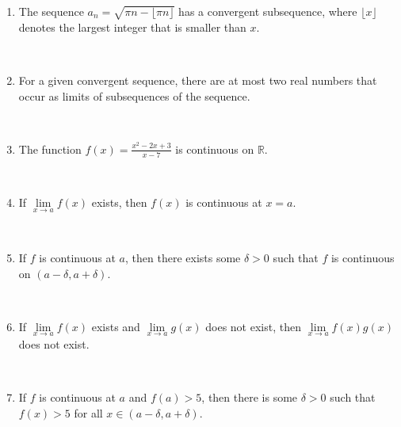 \documentclass[12pt]{amsart}
\def\d{\delta}
\newcommand{\R}{{\mathbb{R}}}
\numberwithin{equation}{section}
\theoremstyle{plain} %
\theoremstyle{definition}
\theoremstyle{remark}
\begin{document}
\begin{enumerate}
 \
 

	
	
	 
 
 \item  The sequence $a_n =\sqrt{\pi n - \lfloor \pi n\rfloor}$ has a convergent subsequence, where $\lfloor x \rfloor$ denotes the largest integer that is smaller than $x$.
 
 \
 

 
 \item  For a given convergent sequence,  there are at most two real numbers that occur as limits of subsequences of the sequence.
 
 \

 
	 
	 \item  The function $\displaystyle f(x) = \frac{x^2 - 2x + 3}{x-7}$ is continuous on $\R$.
	 
	 \
	 

	 
	 \item  If $\lim\limits_{x\to a} f(x)$ exists, then $f(x)$ is continuous at $x=a$.
	 
	 \
	 

	 
	 \item  If $f$ is continuous at $a$, then there exists some $\d>0$ such that $f$ is continuous on $(a-\d, a+\d)$.
	 
	 \
	 
	 	\item If $\lim\limits_{x\to a} f(x)$ exists and $\lim\limits_{x\to a} g(x)$ does not exist, then $\lim\limits_{x\to a} f(x)  g(x)$ does not exist.
	
	\

	 
	 	 \item  If $f$ is continuous at $a$ and $f(a)>5$, then there is some $\delta>0$ such that $f(x)>5 $ for all $x\in (a-\delta,a+\delta)$.
	 
	 \
	 

 
 
 

\end{enumerate}
\end{document}
